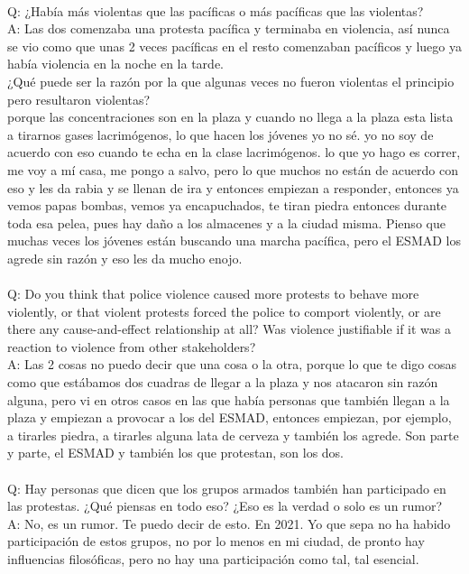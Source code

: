 \documentclass{phyasgn}\usepackage{nag}
\begin{document}
\\
Q: ¿Había más violentas que las pacíficas o más pacíficas que las violentas?\\
A: Las dos comenzaba una protesta pacífica y terminaba en violencia, así nunca se vio como que unas 2 veces pacíficas en el resto comenzaban pacíficos y luego ya había violencia en la noche en la tarde. \\
¿Qué puede ser la razón por la que algunas veces no fueron violentas el principio pero resultaron violentas?\\
porque las concentraciones son en la plaza y cuando no llega a la plaza esta lista a tirarnos gases lacrimógenos, lo que hacen los jóvenes yo no sé. yo no soy de acuerdo con eso cuando te echa en la clase lacrimógenos. lo que yo hago es correr, me voy a mí casa, me pongo a salvo, pero lo que muchos no están de acuerdo con eso y les da rabia y se llenan de ira y entonces empiezan a responder, entonces ya vemos papas bombas, vemos ya encapuchados, te tiran piedra entonces durante toda esa pelea, pues hay daño a los almacenes y a la ciudad misma. Pienso que muchas veces los jóvenes están buscando una marcha pacífica, pero el ESMAD los agrede sin razón y eso les da mucho enojo.\\
\\
Q: Do you think that police violence caused more protests to behave more violently, or that violent protests forced the police to comport violently, or are there any cause-and-effect relationship at all? Was violence justifiable if it was a reaction to violence from other stakeholders? \\
A: Las 2 cosas no puedo decir que una cosa o la otra, porque lo que te digo cosas como que estábamos dos cuadras de llegar a la plaza y nos atacaron sin razón alguna, pero vi en otros casos en las que había personas que también llegan a la plaza y empiezan a provocar a los del ESMAD, entonces empiezan, por ejemplo, a tirarles piedra, a tirarles alguna lata de cerveza y también los agrede. Son parte y parte, el ESMAD y también los que protestan, son los dos. \\
\\
Q: Hay personas que dicen que los grupos armados también han participado en las protestas. ¿Qué piensas en todo eso? ¿Eso es la verdad o solo es un rumor?\\
A: No, es un rumor. Te puedo decir de esto. En 2021. Yo que sepa no ha habido participación de estos grupos, no por lo menos en mi ciudad, de pronto hay influencias filosóficas, pero no hay una participación como tal, tal esencial.\\
\end{document}
